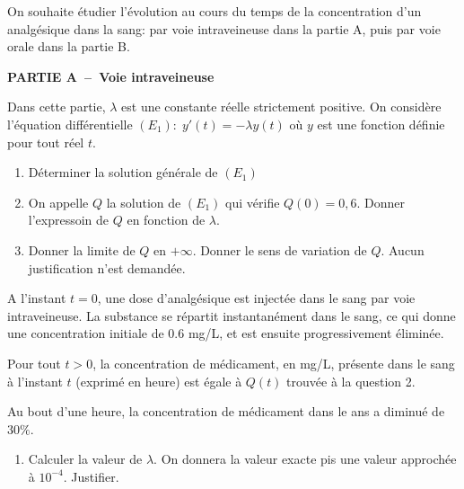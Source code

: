 \def\level{BTS}  %
\def\course{CIEL 2}
\def\chaptername{CIEL2~--~Accompagnement Personnalisé} %
\def\docpart{Equations différentielles AP2} %
\def\docname{C202} %
\pagestyle{cours_FP}
\makeheaderBTS{} %

\begin{exercice_cours}[\quad]{}


	On souhaite étudier l'évolution au cours du temps de la concentration d'un analgésique dans la sang: par voie intraveineuse dans la partie A, puis par voie orale dans la partie B.

	\medskip

	\textbf{PARTIE A~--~Voie intraveineuse}\par

	\medskip

	Dans cette partie, $\lambda$ est une constante réelle strictement positive. On considère l'équation différentielle $(E_1):\;y'(t)=-\lambda y(t)$ où $y$ est une fonction définie pour tout réel $t$.



\begin{enumerate}[series=A]
	\item Déterminer la solution générale de $(E_1)$
	\item On appelle $Q$ la solution de $(E_1)$ qui vérifie $Q(0)=0,6$. Donner l'expressoin de $Q$ en fonction de $\lambda$.
	\item Donner la limite de $Q$ en $+\infty$. Donner le sens de variation de $Q$. Aucun justification n'est demandée.
\end{enumerate}


A l'instant $t=0$, une dose d'analgésique est injectée dans le sang par voie intraveineuse. La substance se répartit instantanément dans le sang, ce qui donne une concentration initiale de $0.6$ mg/L, et est ensuite progressivement éliminée.

Pour tout $t>0$, la concentration de médicament, en mg/L, présente dans le sang à l'instant $t$ (exprimé en heure) est égale à $Q(t)$ trouvée à la question 2.

Au bout d'une heure, la concentration de médicament dans le ans a diminué de $30\%$.

\begin{enumerate}[series=A, resume]
	\item Calculer la valeur de $\lambda$. On donnera la valeur exacte pis une valeur approchée à $10^{-4}$. Justifier.
	

\end{enumerate}
\end{exercice_cours}
